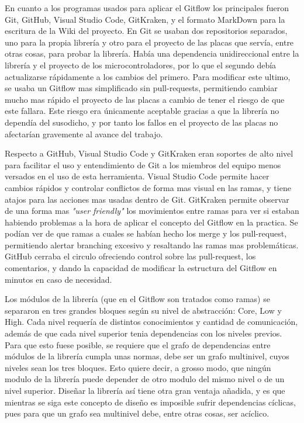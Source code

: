 \documentclass{report}
\begin{document}
En cuanto a los programas usados para aplicar el Gitflow los principales fueron Git, GitHub, Visual Studio Code, GitKraken, y el formato MarkDown para la escritura de la Wiki del proyecto. En Git se usaban dos repositorios separados, uno para la propia librería y otro para el proyecto de las placas que servía, entre otras cosas, para probar la librería. Había una dependencia unidireccional entre la librería y el proyecto de los microcontroladores, por lo que el segundo debía actualizarse rápidamente a los cambios del primero. Para modificar este ultimo, se usaba un Gitflow mas simplificado sin pull-requests, permitiendo cambiar mucho mas rápido el proyecto de las placas a cambio de tener el riesgo de que este fallara. Este riesgo era únicamente aceptable gracias a que la librería no dependía del susodicho, y por tanto los fallos en el proyecto de las placas no afectarían gravemente al avance del trabajo. \par
Respecto a GitHub, Visual Studio Code y GitKraken eran soportes de alto nivel para facilitar el uso y entendimiento de Git a los miembros del equipo menos versados en el uso de esta herramienta. Visual Studio Code permite hacer cambios rápidos y controlar conflictos de forma mas visual en las ramas, y tiene atajos para las acciones mas usadas dentro de Git. GitKraken permite observar de una forma mas \textit{"user friendly"} los movimientos entre ramas para ver si estaban habiendo problemas a la hora de aplicar el concepto del Gitflow en la practica. Se podían ver de que ramas a cuales se habían hecho los merge y los pull-request, permitiendo alertar branching excesivo y resaltando las ramas mas problemáticas. GitHub cerraba el circulo ofreciendo control sobre las pull-request, los comentarios, y dando la capacidad de modificar la estructura del Gitflow en minutos en caso de necesidad.
\par \vspace{0.3 cm}
Los módulos de la librería (que en el Gitflow son tratados como ramas) se separaron en tres grandes bloques según su nivel de abstracción: Core, Low y High. Cada nivel requería de distintos conocimientos y cantidad de comunicación, además de que cada nivel superior tenia dependencias con los niveles previos. Para que esto fuese posible, se requiere que el grafo de dependencias entre módulos de la librería cumpla unas normas, debe ser un grafo multinivel, cuyos niveles sean los tres bloques. Esto quiere decir, a grosso modo, que ningún modulo de la librería puede depender de otro modulo del mismo nivel o de un nivel superior. Diseñar la librería así tiene otra gran ventaja añadida, y es que mientras se siga este concepto de diseño es imposible sufrir dependencias cíclicas, pues para que un grafo sea multinivel debe, entre otras cosas, ser acíclico. \par
\end{document}
